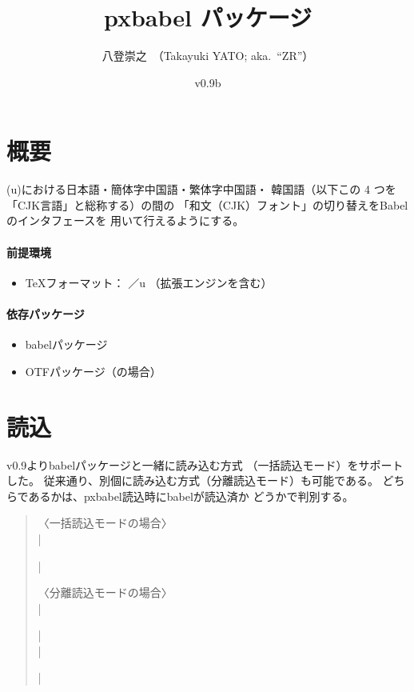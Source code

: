 \documentclass[a4paper,uplatex]{jsarticle}
\newcommand{\PkgVersion}{0.9b}
\newcommand{\PkgDate}{2012/08/19}
\newcommand{\Pkg}[1]{\textsf{#1}}
\newcommand{\Meta}[1]{$\langle$\mbox{}#1\mbox{}$\rangle$}
\providecommand{\upLaTeX}{u\pLaTeX}
\begin{document}
\title{\Pkg{pxbabel} パッケージ}
\author{八登崇之\ （Takayuki YATO; aka.~``ZR''）}
\date{v\PkgVersion\quad [\PkgDate]}
\maketitle

\section{概要}

{(u)\pLaTeX}における日本語・簡体字中国語・繁体字中国語・
韓国語（以下この 4 つを「CJK言語」と総称する）の間の
「和文（CJK）フォント」の切り替えをBabelのインタフェースを
用いて行えるようにする。

\paragraph{前提環境}

\begin{itemize}
\item {\TeX}フォーマット： {\pLaTeX}／{\upLaTeX}
  （拡張エンジンを含む）
\end{itemize}

\paragraph{依存パッケージ}

\begin{itemize}
\item \Pkg{babel}パッケージ
\item \Pkg{OTF}パッケージ（{\pLaTeX}の場合）
\end{itemize}

\section{読込}

v0.9より\Pkg{babel}パッケージと一緒に読み込む方式
（一括読込モード）をサポートした。
従来通り、別個に読み込む方式（分離読込モード）も可能である。
どちらであるかは、\Pkg{pxbabel}読込時に\Pkg{babel}が読込済か
どうかで判別する。

\begin{quote}
〈一括読込モードの場合〉\\
|\usepackage[|\Meta{オプション}|]{pxbabel}|
\par\bigskip
〈分離読込モードの場合〉\\
|\usepackage[|\Meta{Babelのオプション}|]{babel}|\\
|\usepackage[|\Meta{オプション}|]{pxbabel}|
\end{quote}
\end{document}
